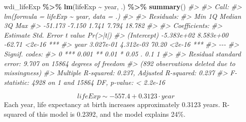 \documentclass[
  xelatex, ja=standard]{bxjsbook}
\newenvironment{Shaded}{\begin{snugshade}}{\end{snugshade}}
\newcommand{\CommentTok}[1]{\textcolor[rgb]{0.56,0.35,0.01}{\textit{#1}}}
\newcommand{\FunctionTok}[1]{\textcolor[rgb]{0.13,0.29,0.53}{\textbf{#1}}}
\newcommand{\NormalTok}[1]{#1}
\newcommand{\SpecialCharTok}[1]{\textcolor[rgb]{0.81,0.36,0.00}{\textbf{#1}}}
\theoremstyle{definition}
\theoremstyle{definition}
\theoremstyle{definition}
\theoremstyle{definition}
\theoremstyle{remark}
\begin{document}
\begin{Shaded}
\begin{Highlighting}[]
\NormalTok{wdi\_lifeExp }\SpecialCharTok{\%\textgreater{}\%} \FunctionTok{lm}\NormalTok{(lifeExp }\SpecialCharTok{\textasciitilde{}}\NormalTok{ year, .) }\SpecialCharTok{\%\textgreater{}\%} \FunctionTok{summary}\NormalTok{()}
\CommentTok{\#\textgreater{} }
\CommentTok{\#\textgreater{} Call:}
\CommentTok{\#\textgreater{} lm(formula = lifeExp \textasciitilde{} year, data = .)}
\CommentTok{\#\textgreater{} }
\CommentTok{\#\textgreater{} Residuals:}
\CommentTok{\#\textgreater{}     Min      1Q  Median      3Q     Max }
\CommentTok{\#\textgreater{} {-}51.173  {-}7.150   1.741   7.794  18.782 }
\CommentTok{\#\textgreater{} }
\CommentTok{\#\textgreater{} Coefficients:}
\CommentTok{\#\textgreater{}               Estimate Std. Error t value Pr(\textgreater{}|t|)    }
\CommentTok{\#\textgreater{} (Intercept) {-}5.383e+02  8.583e+00  {-}62.71   \textless{}2e{-}16 ***}
\CommentTok{\#\textgreater{} year         3.027e{-}01  4.312e{-}03   70.20   \textless{}2e{-}16 ***}
\CommentTok{\#\textgreater{} {-}{-}{-}}
\CommentTok{\#\textgreater{} Signif. codes:  }
\CommentTok{\#\textgreater{} 0 \textquotesingle{}***\textquotesingle{} 0.001 \textquotesingle{}**\textquotesingle{} 0.01 \textquotesingle{}*\textquotesingle{} 0.05 \textquotesingle{}.\textquotesingle{} 0.1 \textquotesingle{} \textquotesingle{} 1}
\CommentTok{\#\textgreater{} }
\CommentTok{\#\textgreater{} Residual standard error: 9.707 on 15864 degrees of freedom}
\CommentTok{\#\textgreater{}   (892 observations deleted due to missingness)}
\CommentTok{\#\textgreater{} Multiple R{-}squared:  0.237,  Adjusted R{-}squared:  0.237 }
\CommentTok{\#\textgreater{} F{-}statistic:  4928 on 1 and 15864 DF,  p{-}value: \textless{} 2.2e{-}16}
\end{Highlighting}
\end{Shaded}

\[lifeExp \sim -557.4 + 0.3123 \cdot year\] Each year, life expectancy at birth increases approximately 0.3123 years. R-squared of this model is 0.2392, and the model explains 24\%.
\end{document}
